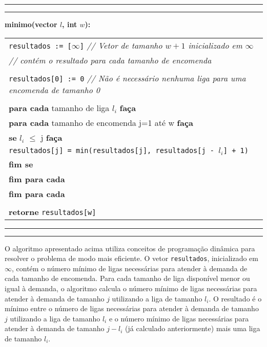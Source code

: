 \documentclass[12pt]{article}
\begin{document}
		\vspace{12pt}
		\hrule
		\vspace{3pt}
		\hrule
		\noindent\textbf{minimo(vector $l$, int $w$):} \\
		\noindent\begin{tabular}{l}
			\texttt{resultados := [$\infty$]} \footnotesize \textit{// Vetor de tamanho $w + 1$ inicializado em $\infty$} \\
			\indent \indent \indent \indent \footnotesize \textit{// contém o resultado para cada tamanho de encomenda} \\
			\\
			\texttt{resultados[0] := 0} \footnotesize \textit{// Não é necessário nenhuma liga para uma encomenda de tamanho 0} \\
			\\
			\textbf{para cada} tamanho de liga $l_i$ \textbf{faça} \\
			\indent \textbf{para cada} tamanho de encomenda j=1 até w \textbf{faça} \\
			\indent \indent \textbf{se} $l_i$ $\leq$ j \textbf{faça} \\
			\indent \indent \indent \texttt{resultados[j] = min(resultados[j], resultados[j - $l_i$] + 1)} \\
			\indent \indent \textbf{fim se} \\
			\indent \textbf{fim para cada} \\
			\textbf{fim para cada} \\
			\\
			\textbf{retorne} \texttt{resultados[w]}
		\end{tabular}
		\hrule
		\vspace{3pt}
		\hrule
		\vspace{12pt}

		\par O algoritmo apresentado acima utiliza conceitos de programação dinâmica para resolver o problema de modo mais eficiente. O vetor \texttt{resultados}, inicializado em $\infty$, contém o número mínimo de ligas necessárias para atender à demanda de cada tamanho de encomenda. Para cada tamanho de liga disponível menor ou igual à demanda, o algoritmo calcula o número mínimo de ligas necessárias para atender à demanda de tamanho $j$ utilizando a liga de tamanho $l_i$. O resultado é o mínimo entre o número de ligas necessárias para atender à demanda de tamanho $j$ utilizando a liga de tamanho $l_i$ e o número mínimo de ligas necessárias para atender à demanda de tamanho $j - l_i$ (já calculado anteriormente) mais uma liga de tamanho $l_i$.
\end{document}
